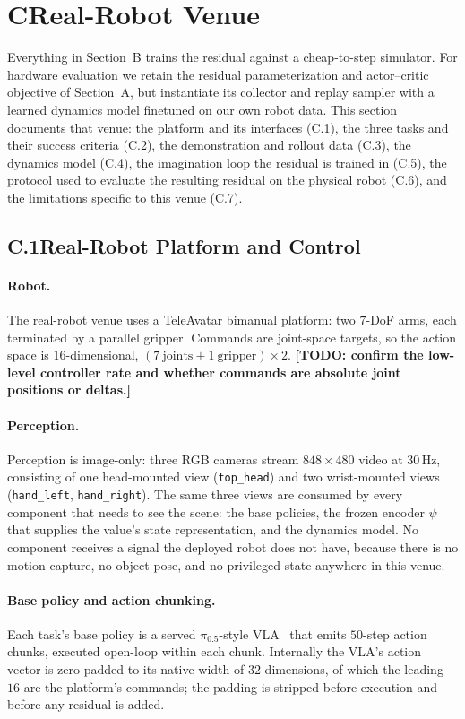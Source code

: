 \documentclass[letterpaper]{article} %
\newcommand{\todo}[1]{\textbf{[TODO: #1]}}
\begin{document}
\section{C\quad Real-Robot Venue}

Everything in Section~B trains the residual against a cheap-to-step simulator. For
hardware evaluation we retain the residual parameterization and actor--critic objective of
Section~A, but instantiate its collector and replay sampler with a learned dynamics model
finetuned on our own robot data. This section documents that venue: the platform and its
interfaces (C.1), the three tasks and their success
criteria (C.2), the demonstration and rollout data (C.3), the dynamics model (C.4),
the imagination loop the residual is trained in (C.5), the protocol used to evaluate
the resulting residual on the physical robot (C.6), and the limitations specific to
this venue (C.7).

\subsection{C.1\quad Real-Robot Platform and Control}

\paragraph{Robot.}
The real-robot venue uses a TeleAvatar bimanual platform: two $7$-DoF arms, each
terminated by a parallel gripper. Commands are joint-space targets, so the action
space is $16$-dimensional, $(7\ \text{joints} + 1\ \text{gripper}) \times 2$.
\todo{confirm the low-level controller rate and whether commands are absolute
joint positions or deltas.}

\paragraph{Perception.}
Perception is image-only: three RGB cameras stream $848{\times}480$ video at
$30$\,Hz, consisting of one head-mounted view (\texttt{top\_head}) and two wrist-mounted views
(\texttt{hand\_left}, \texttt{hand\_right}). The same three views are consumed by
every component that needs to see the scene: the base policies, the frozen
encoder $\psi$ that supplies the value's state representation, and the dynamics
model. No component receives a signal the deployed robot does not have, because there is
no motion capture, no object pose, and no privileged state anywhere in this
venue.

\paragraph{Base policy and action chunking.}
Each task's base policy is a served $\pi_{0.5}$-style VLA~\cite{sima2026kai0} that
emits $50$-step
action chunks, executed open-loop within each chunk. Internally the VLA's action
vector is zero-padded to its native width of $32$ dimensions, of which the
leading $16$ are the platform's commands; the padding is stripped before
execution and before any residual is added.
\end{document}
